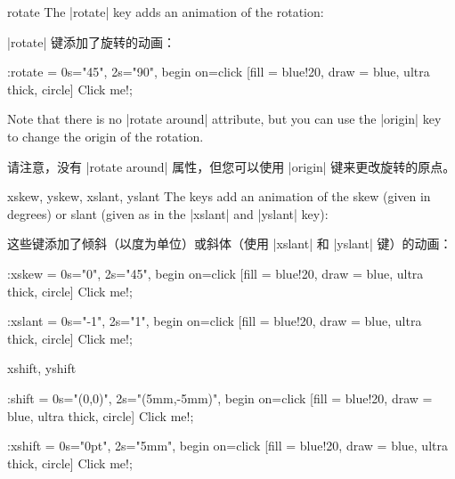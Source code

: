 \begin{tikzanimateattribute}{rotate}
    The |rotate| key adds an animation of the rotation:
    
    |rotate| 键添加了旋转的动画：
\begin{codeexample}[
    preamble={\usetikzlibrary{animations}},
    animation list={0.5,1,1.5,2},
]
\tikz \node :rotate = { 0s="45", 2s="90", begin on=click}
  [fill = blue!20, draw = blue, ultra thick, circle] {Click me!};
\end{codeexample}
    Note that there is no |rotate around| attribute, but you can use the
    |origin| key to change the origin of the rotation.

    请注意，没有 |rotate around| 属性，但您可以使用 |origin| 键来更改旋转的原点。
\end{tikzanimateattribute}

\begin{tikzanimateattribute}{xskew, yskew, xslant, yslant}
    The keys add an animation of the skew (given in degrees) or slant (given as
    in the |xslant| and |yslant| key):
    
    这些键添加了倾斜（以度为单位）或斜体（使用 |xslant| 和 |yslant| 键）的动画：

\begin{codeexample}[
    preamble={\usetikzlibrary{animations}},
    animation list={0.5,1,1.5,2},
]
\tikz \node :xskew = { 0s="0", 2s="45", begin on=click}
  [fill = blue!20, draw = blue, ultra thick, circle] {Click me!};
\end{codeexample}
\begin{codeexample}[
    preamble={\usetikzlibrary{animations}},
    animation list={0.5,1,1.5,2},
]
\tikz \node :xslant = { 0s="-1", 2s="1", begin on=click}
  [fill = blue!20, draw = blue, ultra thick, circle] {Click me!};
\end{codeexample}
\end{tikzanimateattribute}

\begin{tikzanimateattribute}{xshift, yshift}
\begin{codeexample}[
    preamble={\usetikzlibrary{animations}},
    animation list={0.5,1,1.5,2},
]
\tikz \node :shift = { 0s="{(0,0)}", 2s="{(5mm,-5mm)}",
                       begin on=click}
  [fill = blue!20, draw = blue, ultra thick, circle] {Click me!};
\end{codeexample}

\begin{codeexample}[
    preamble={\usetikzlibrary{animations}},
    animation list={0.5,1,1.5,2},
]
\tikz \node :xshift = { 0s="0pt", 2s="5mm", begin on=click}
  [fill = blue!20, draw = blue, ultra thick, circle] {Click me!};
\end{codeexample}
\end{tikzanimateattribute}

